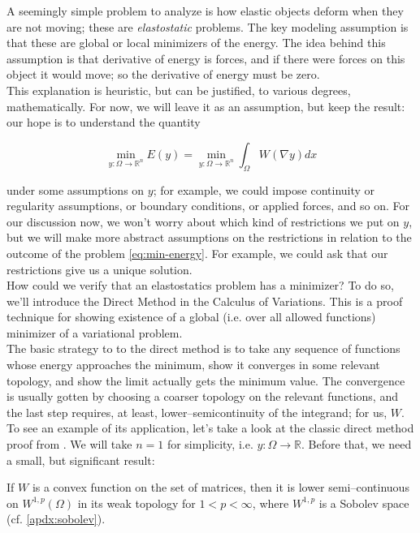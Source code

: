 \documentclass[../main.tex]{subfiles}
\begin{document}
A seemingly simple problem to analyze is how elastic objects deform when they are not moving; these are \emph{elastostatic} problems.
The key modeling assumption is that these are global or local minimizers of the energy.
The idea behind this assumption is that derivative of energy is forces, and if there were forces on this object it would move; so the derivative of energy must be zero. \\

This explanation is heuristic, but can be justified, to various degrees, mathematically.
For now, we will leave it as an assumption, but keep the result: our hope is to understand the quantity

\begin{equation}
  \label{eq:min-energy}
  \min_{y: \Omega \to \mathbb{R}^n} E(y) = \min_{y: \Omega \to \mathbb{R}^n} \int_{\Omega}W( \nabla y) dx
\end{equation}

under some assumptions on $y$; for example, we could impose continuity or regularity assumptions, or boundary conditions, or applied forces, and so on.
For our discussion now, we won't worry about which kind of restrictions we put on $y$, but we will make more abstract assumptions on the restrictions in relation to the outcome of the problem \eqref{eq:min-energy}.
For example, we could ask that our restrictions give us a unique solution. \\

How could we verify that an elastostatics problem has a minimizer? To do so, we'll introduce the Direct Method in the Calculus of Variations.
This is a proof technique for showing existence of a global (i.e. over all allowed functions) minimizer  of a variational problem. \\

The basic strategy to to the direct method is to take any sequence of functions whose energy approaches the minimum, show it converges in some relevant topology, and show the limit actually gets the minimum value.
The convergence is usually gotten by choosing a coarser topology on the relevant functions, and the last step requires, at least, lower--semicontinuity of the integrand; for us, $W$.
To see an example of its application, let's take a look at the classic direct method proof from \cite{evans_partial_2010}.
We will take $n=1$ for simplicity, i.e. $y: \Omega \to \mathbb{R}$.
Before that, we need a small, but significant result:

\begin{lem}
  If $W$ is a convex function on the set of matrices, then it is lower semi--continuous on $W^{1,p}(\Omega)$ in its weak topology for $1 < p < \infty$, where $W^{1,p}$ is a Sobolev space (cf. \ref{apdx:sobolev}).
\end{lem}
\end{document}
